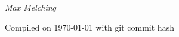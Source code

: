 \documentclass[relativity_main.tex]{subfiles}
\begin{document}
\begin{center}
{%
	\Large%
	\slshape%
	Max Melching%
}


\vspace{\baselineskip}


{Compiled on \today{} with git commit hash 
\code{%
	\HEAD{}%
}\hspace{-0.5em}}


\end{center}
\end{document}
